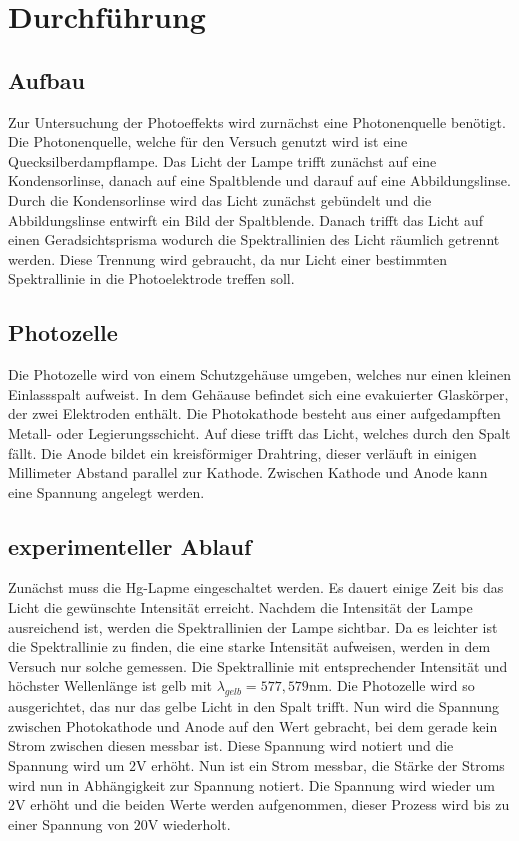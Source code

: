\section{Durchführung}
\label{sec:Durchführung}
\subsection{Aufbau}
Zur Untersuchung der Photoeffekts wird zurnächst eine Photonenquelle benötigt.
Die Photonenquelle, welche für den Versuch genutzt wird ist eine Quecksilberdampflampe.
Das Licht der Lampe trifft zunächst auf eine Kondensorlinse, danach auf eine Spaltblende und darauf auf eine Abbildungslinse.
Durch die Kondensorlinse wird das Licht zunächst gebündelt und die Abbildungslinse entwirft ein Bild der Spaltblende.
Danach trifft das Licht auf einen Geradsichtsprisma wodurch die Spektrallinien des Licht räumlich getrennt werden.
Diese Trennung wird gebraucht, da nur Licht einer bestimmten Spektrallinie in die Photoelektrode treffen soll.

\subsection{Photozelle}
Die Photozelle wird von einem Schutzgehäuse umgeben, welches nur einen kleinen Einlassspalt aufweist.
In dem Gehäause befindet sich eine evakuierter Glaskörper, der zwei Elektroden enthält.
Die Photokathode besteht aus einer aufgedampften Metall- oder Legierungsschicht.
Auf diese trifft das Licht, welches durch den Spalt fällt.
Die Anode bildet ein kreisförmiger Drahtring, dieser verläuft in einigen Millimeter Abstand parallel zur Kathode.
Zwischen Kathode und Anode kann eine Spannung angelegt werden.

\subsection{experimenteller Ablauf}
Zunächst muss die Hg-Lapme eingeschaltet werden.
Es dauert einige Zeit bis das Licht die gewünschte Intensität erreicht.
Nachdem die Intensität der Lampe ausreichend ist, werden die Spektrallinien der Lampe sichtbar.
Da es leichter ist die Spektrallinie zu finden, die eine starke Intensität aufweisen, werden in dem Versuch nur solche gemessen.
Die Spektrallinie mit entsprechender Intensität und höchster Wellenlänge ist gelb mit $\lambda_{gelb} = 577,579 \si{\nano\meter}$.
Die Photozelle wird so ausgerichtet, das nur das gelbe Licht in den Spalt trifft.
Nun wird die Spannung zwischen Photokathode und Anode auf den Wert gebracht, bei dem gerade kein Strom zwischen diesen messbar ist.
Diese Spannung wird notiert und die Spannung wird um $2\si{\V}$ erhöht.
Nun ist ein Strom messbar, die Stärke der Stroms wird nun in Abhängigkeit zur Spannung notiert.
Die Spannung wird wieder um $2\si{\V}$ erhöht und die beiden Werte werden aufgenommen, dieser Prozess wird bis zu einer Spannung von $20\si{\V}$ wiederholt.


